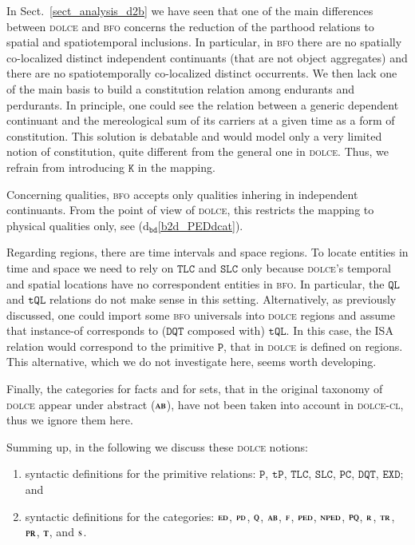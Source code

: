 \documentclass[ao]{iosart2x}
\newcommand{\bdDefLabel}{\textrm{d$_\texttt{bd}$}}
\newcommand{\refbddf}[1]{({\bdDefLabel}\ref{#1})}
\newcommand{\pr}[1]{\mathtt{#1}}
\newcommand{\dolce}{{\textsc{dolce}}}
\newcommand{\bfo}{{\textsc{bfo}}}
\newcommand {\ABdcat} {\textsc{ab}}
\newcommand {\EDdcat} {\textsc{ed}}
\newcommand {\Fdcat} {\textsc{f}}
\newcommand {\NPEDdcat} {\textsc{nped}}
\newcommand {\PDdcat} {\textsc{pd}}
\newcommand {\PEDdcat} {\textsc{ped}}
\newcommand {\PQdcat} {\textsc{pq}}
\newcommand {\PRdcat} {\textsc{pr}}
\newcommand {\Qdcat} {\textsc{q}}
\newcommand {\Rdcat} {\textsc{r}}
\newcommand {\Sdcat} {\textsc{s}}
\newcommand {\TRdcat} {\textsc{tr}}
\newcommand {\Tdcat} {\textsc{t}}
\newcommand {\TPd} {\ensuremath{\pr{tP}}}
\newcommand {\Pd} {\ensuremath{\pr{P}}}
\newcommand {\DQTd} {\ensuremath{\pr{DQT}}}
\newcommand {\QLd} {\ensuremath{\pr{QL}}}
\newcommand {\TQLd} {\ensuremath{\pr{tQL}}}
\newcommand {\PCd} {\ensuremath{\pr{PC}}}
\newcommand {\Kd} {\ensuremath{\pr{K}}}
\newcommand {\EXDd} {\ensuremath{\pr{EXD}}}
\newcommand {\SLCd} {\ensuremath{\pr{SLC}}}
\newcommand {\TLCd} {\ensuremath{\pr{TLC}}}
\begin{document}
In Sect.~\ref{sect_analysis_d2b} we have seen that one of the main differences between {\dolce} and {\bfo} concerns the reduction of the parthood relations to spatial and spatiotemporal inclusions. In particular, in {\bfo} there are no spatially co-localized distinct independent continuants (that are not object aggregates) and there are no spatiotemporally co-localized distinct occurrents. We then lack one of the main basis to build a constitution relation among endurants and perdurants. In principle, one could see the relation between a generic dependent continuant and the mereological sum of its carriers at a given time as a form of constitution. This solution is debatable and would model only a very limited notion of constitution, quite different from the general one in {\dolce}. Thus, we refrain from introducing $\Kd$ in the mapping.  

Concerning qualities, {\bfo} accepts only qualities inhering in independent continuants. From the point of view of {\dolce}, this restricts the mapping to physical qualities only, see \refbddf{b2d_PEDdcat}. 

Regarding regions, there are time intervals and space regions. To locate entities in time and space we need to rely on $\TLCd$ and $\SLCd$ only because {\dolce}'s temporal and spatial locations have no correspondent entities in {\bfo}. In particular, the $\QLd$ and $\TQLd$ relations do not make sense in this setting. Alternatively, as previously discussed, one could import some {\bfo} universals into {\dolce} regions and assume that instance-of corresponds to ($\DQTd$ composed with) $\TQLd$. In this case, the ISA relation would correspond to the primitive $\Pd$, that in {\dolce} is defined on regions. This alternative, which we do not investigate here, seems worth developing. %
%

Finally, the categories for facts and for sets, that in the original taxonomy of {\dolce} \citep{D18} appear under abstract ($\ABdcat$), have not been taken into account in {\dolce}-\textsc{cl}, thus we ignore them here. 
 

\smallskip
Summing up, in the following we discuss these {\dolce} notions: 
\begin{enumerate}[$(i)$]
\item syntactic definitions for the primitive relations: $\Pd$, $\TPd$, $\TLCd$, $\SLCd$, $\PCd$, $\DQTd$, $\EXDd$; and 
\item syntactic definitions for the categories: $\EDdcat$, $\PDdcat$, $\Qdcat$, $\ABdcat$, $\Fdcat$, $\PEDdcat$, $\NPEDdcat$, $\PQdcat$, $\Rdcat$, $\TRdcat$, $\PRdcat$, $\Tdcat$, and $\Sdcat$.
\end{enumerate}
\end{document}

